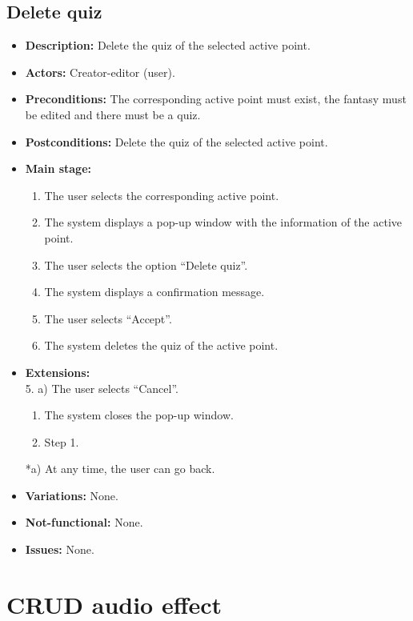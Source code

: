 \subsection{Delete quiz}
\begin{itemize}
	\item \textbf{Description:} Delete the quiz of the selected active point.
	\item \textbf{Actors:} Creator-editor (user).
	\item \textbf{Preconditions:} The corresponding active point must exist, the fantasy must be edited and there must be a quiz.
	\item \textbf{Postconditions:} Delete the quiz of the selected active point.
	\item \textbf{Main stage:}
	\begin{enumerate}
		\item The user selects the corresponding active point.
		\item The system displays a pop-up window with the information of the active point.
		\item The user selects the option ``Delete quiz''.
		\item The system displays a confirmation message.
		\item The user selects ``Accept''.
		\item The system deletes the quiz of the active point.
	\end{enumerate}
	\item \textbf{Extensions:} \\ 5. a) The user selects ``Cancel''.
	\begin{enumerate}
		\item The system closes the pop-up window.
		\item Step 1.
	\end{enumerate}
	*a) At any time, the user can go back.
	\item \textbf{Variations:} None.
	\item \textbf{Not-functional:} None.
	\item \textbf{Issues:} None.
\end{itemize}

\section{CRUD audio effect}
\hypertarget{crearaudio}{}
